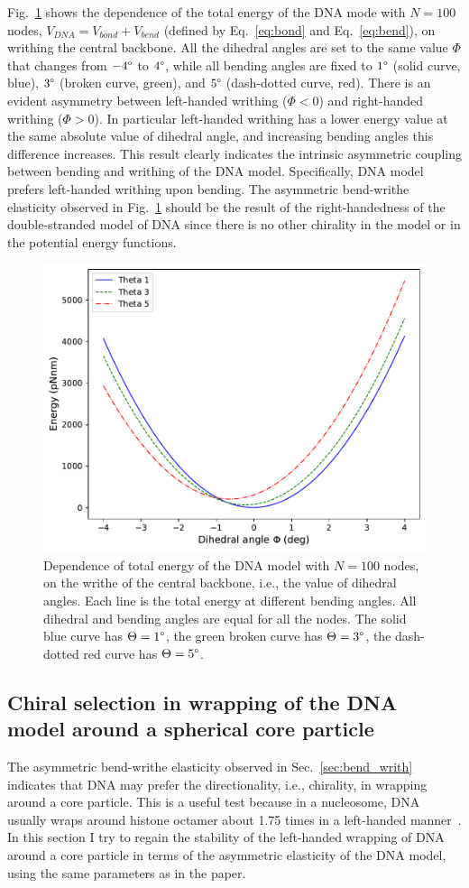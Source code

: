 \documentclass[a4paper,10pt]{article}
\begin{document}
Fig.~\ref{fig:bend_energy} shows the dependence of the total energy of the DNA mode with $N=100$ nodes, $V_{DNA}=V_{bond}+V_{bend}$ (defined by Eq.~\ref{eq:bond} and Eq.~\ref{eq:bend}), on writhing the central backbone.
All the dihedral angles are set to the same value $\Phi$ that changes from $-4\degree$ to $4\degree$, while all bending angles are fixed to $1\degree$ (solid curve, blue), $3\degree$ (broken curve, green), and $5\degree$ (dash-dotted curve, red).
There is an evident asymmetry between left-handed writhing ($\Phi<0$) and right-handed writhing ($\Phi>0$).
In particular left-handed writhing has a lower energy value at the same absolute value of dihedral angle, and increasing bending angles this difference increases.
This result clearly indicates the intrinsic asymmetric coupling between bending and writhing of the DNA model.
Specifically, DNA model prefers left-handed writhing upon bending.
The asymmetric bend-writhe elasticity observed in Fig.~\ref{fig:bend_energy} should be the result of the right-handedness of the double-stranded model of DNA since there is no other chirality in the model or in the potential energy functions.

\begin{figure}[tb]
\centering
\includegraphics[width=.5\textwidth]{bw_energy.pdf}
\caption{Dependence of total energy of the DNA model with $N=100$ nodes, on the writhe of the central backbone, i.e., the value of dihedral angles.
Each line is the total energy at different bending angles.
All dihedral and bending angles are equal for all the nodes.
The solid blue curve has $\Theta=1\degree$, the green broken curve has $\Theta=3\degree$, the dash-dotted red curve has $\Theta=5\degree$.}
\label{fig:bend_energy}
\end{figure}

\subsection{Chiral selection in wrapping of the DNA model around a spherical core particle}\label{sec:core}
The asymmetric bend-writhe elasticity observed in Sec.~\ref{sec:bend_writh} indicates that DNA may prefer the directionality, i.e., chirality, in wrapping around a core particle.
This is a useful test because in a nucleosome, DNA usually wraps around histone octamer about 1.75 times in a left-handed manner~\cite{1, 2}.
In this section I try to regain the stability of the left-handed wrapping of DNA around a core particle in terms of the asymmetric elasticity of the DNA model, using the same parameters as in the paper.
\end{document}
